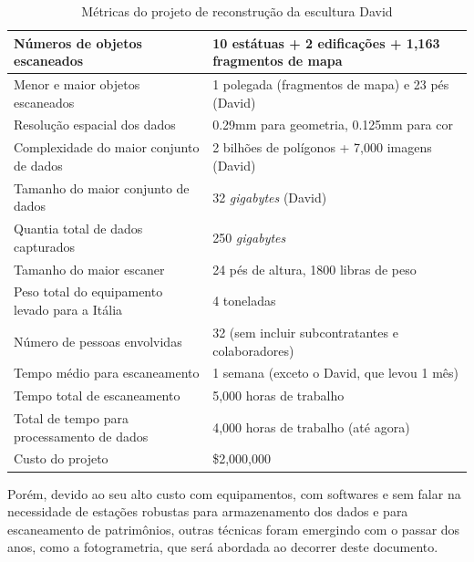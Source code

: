 \begin{table}
\caption{Métricas do projeto de reconstrução da escultura David}
\label{tab:metricasDavid}
\begin{tabular}{|l|p{4.7cm}|}
\hline
Números de objetos escaneados          & 10 estátuas + 2 edificações + 1,163 fragmentos de mapa  \\ \hline
Menor e maior objetos escaneados       & 1 polegada (fragmentos de mapa) e 23 pés (David)         \\ \hline
Resolução espacial dos dados                & 0.29mm para geometria, 0.125mm para cor              \\ \hline
Complexidade do maior conjunto de dados             & 2 bilhões de polígonos + 7,000 imagens (David)\\ \hline
Tamanho do maior conjunto de dados                    & 32 {\it gigabytes} (David)                  \\ \hline
Quantia total de dados capturados              & 250 {\it gigabytes}                                 \\ \hline
Tamanho do maior escaner                    & 24 pés de altura, 1800 libras de peso                  \\ \hline
Peso total do equipamento levado para a Itália & 4 toneladas                                              \\ \hline
Número de pessoas envolvidas                  & 32 (sem incluir subcontratantes e colaboradores) \\ \hline
Tempo médio para escaneamento              & 1 semana (exceto o David, que levou 1 mês)       \\ \hline
Tempo total de escaneamento                 & 5,000 horas de trabalho                                   \\ \hline
Total de tempo para processamento de dados          & 4,000 horas de trabalho (até agora)                            \\ \hline
Custo do projeto                          & \$2,000,000                                         \\ \hline
\end{tabular}
\end{table}

Porém, devido ao seu alto custo com equipamentos, com softwares e sem falar na necessidade de estações robustas para armazenamento dos dados e para escaneamento de patrimônios, outras técnicas foram emergindo com o passar dos anos, como a fotogrametria, que será abordada ao decorrer deste documento.

% 